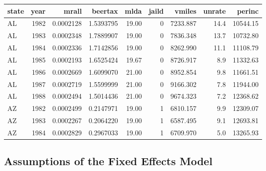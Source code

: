 \documentclass[]{article}
\theoremstyle{definition}
\theoremstyle{definition}
\theoremstyle{remark}
\begin{document}
\begin{tabular}{l|r|r|r|r|r|r|r|r}
\hline
state & year & mrall & beertax & mlda & jaild & vmiles & unrate & perinc\\
\hline
AL & 1982 & 0.0002128 & 1.5393795 & 19.00 & 0 & 7233.887 & 14.4 & 10544.15\\
\hline
AL & 1983 & 0.0002348 & 1.7889907 & 19.00 & 0 & 7836.348 & 13.7 & 10732.80\\
\hline
AL & 1984 & 0.0002336 & 1.7142856 & 19.00 & 0 & 8262.990 & 11.1 & 11108.79\\
\hline
AL & 1985 & 0.0002193 & 1.6525424 & 19.67 & 0 & 8726.917 & 8.9 & 11332.63\\
\hline
AL & 1986 & 0.0002669 & 1.6099070 & 21.00 & 0 & 8952.854 & 9.8 & 11661.51\\
\hline
AL & 1987 & 0.0002719 & 1.5599999 & 21.00 & 0 & 9166.302 & 7.8 & 11944.00\\
\hline
AL & 1988 & 0.0002494 & 1.5014436 & 21.00 & 0 & 9674.323 & 7.2 & 12368.62\\
\hline
AZ & 1982 & 0.0002499 & 0.2147971 & 19.00 & 1 & 6810.157 & 9.9 & 12309.07\\
\hline
AZ & 1983 & 0.0002267 & 0.2064220 & 19.00 & 1 & 6587.495 & 9.1 & 12693.81\\
\hline
AZ & 1984 & 0.0002829 & 0.2967033 & 19.00 & 1 & 6709.970 & 5.0 & 13265.93\\
\hline
\end{tabular}

\subsection{Assumptions of the Fixed Effects
Model}\label{assumptions-of-the-fixed-effects-model}
\end{document}
